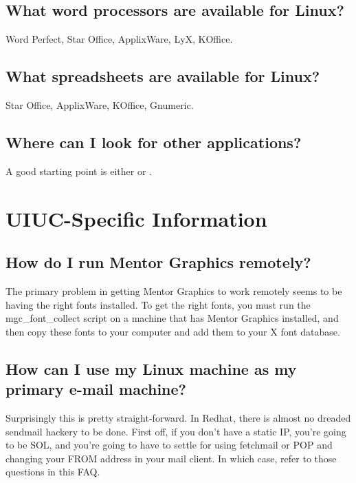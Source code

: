 \documentclass[a4paper]{article}
\begin{document}
\subsection{What word processors are available for Linux?}

Word Perfect, Star Office, ApplixWare, LyX, KOffice.




\subsection{What spreadsheets are available for Linux?}

Star Office, ApplixWare, KOffice, Gnumeric.




\subsection{Where can I look for other applications?}

A good starting point is either  or .




\section{UIUC-Specific Information}


\subsection{How do I run Mentor Graphics remotely?}

The primary problem in getting Mentor Graphics to work remotely seems to 
be having the right fonts installed.  To get the right fonts, you must
run the mgc\_font\_collect script on a machine that has Mentor Graphics
installed, and then copy these fonts to your computer and add them to
your X font database.




\subsection{How can I use my Linux machine as my primary e-mail machine?}

Surprisingly this is pretty straight-forward. In Redhat, there is almost no
dreaded sendmail hackery to be done. First off, if you don't have a static IP,
you're going to be SOL, and you're going to have to settle for using
fetchmail or POP and changing your FROM address in your mail client. In which 
case, refer to those questions in this FAQ.
\end{document}
